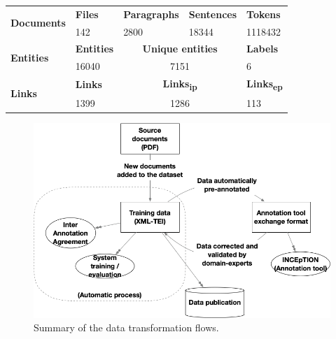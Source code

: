 \documentclass[]{interact}
\theoremstyle{plain}%
\theoremstyle{definition}
\theoremstyle{remark}
\begin{document}
\begin{table}[ht]
    {\begin{tabular}{ m{6em}   m{4em}  m{6em}  m{7em}  m{6em} } 
    \toprule
        \multirow{2}{5em}{\textbf{Documents}} & \textbf{Files} & \textbf{Paragraphs} &	\textbf{Sentences} & \textbf{Tokens}\\
         & 142  &	2800 & 	18344 & 	1118432\\
    \midrule
        \multirow{2}{5em}{\textbf{Entities}} & \textbf{Entities} &  \multicolumn{2}{|c|}{\textbf{Unique entities}} &  \textbf{ Labels} \\
        & 16040 &  \multicolumn{2}{c}{7151} &  6 \\
    \midrule
        \multirow{2}{5em}{\textbf{Links}} & \textbf{Links} & \multicolumn{2}{|c|}{\textbf{Links\textsubscript{ip}}} 
        & \textbf{Links\textsubscript{ep}}\\
        & 1399  & \multicolumn{2}{c}{1286} &	113	\\
    \bottomrule
    \end{tabular}}
    \label{table:summary-content}
\end{table}



\begin{figure}[htb]
    \centering
    \includegraphics[width=\linewidth]{data-transformation.png}
    \caption{Summary of the data transformation flows.}
    \label{fig:data-transformation}
\end{figure}
\end{document}
